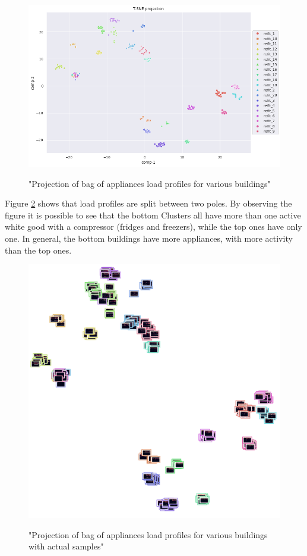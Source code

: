 \begin{figure}[H]
	\centering
	\caption{"Projection of bag of appliances load profiles for various buildings"}
	\includegraphics[width=.8\textwidth]{Figures/TSNE/TSNE_BOA/refit/scatter_refit_all.png}
	\label{fig:tsne_boa_scatter_refit8}
\end{figure}

Figure \ref{fig:tsne_boa_img_scatter_refit8} shows that load profiles are split 
between two poles. By observing the figure it is possible to see that the bottom Clusters
all have more than one active white good with a compressor (fridges and freezers), while
the top ones have only one. In general, the bottom buildings have more appliances,
with more activity than the top ones. 

\begin{figure}[H]
	\centering
	\caption{"Projection of bag of appliances load profiles for various buildings with actual samples"}
	\includegraphics[width=.9\textwidth]{Figures/TSNE/TSNE_BOA/refit/img_scatter_refitall.png}
	\label{fig:tsne_boa_img_scatter_refit8}
\end{figure}